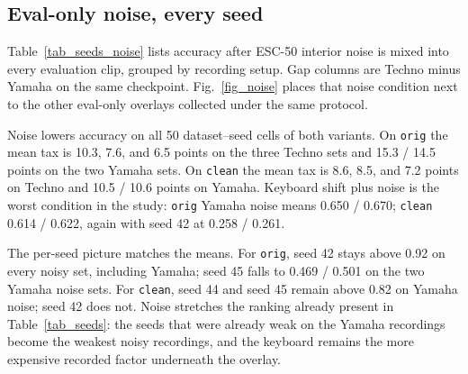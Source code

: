 \documentclass[pdflatex,sn-mathphys-num,iicol]{sn-jnl}
\begin{document}
\subsection{Eval-only noise, every seed}\label{subsec_res_noise}

Table~\ref{tab_seeds_noise} lists accuracy after ESC-50 interior noise is mixed into every evaluation clip, grouped by recording setup. Gap columns are Techno minus Yamaha on the same checkpoint. Fig.~\ref{fig_noise} places that noise condition next to the other eval-only overlays collected under the same protocol.

Noise lowers accuracy on all 50 dataset--seed cells of both variants. On \texttt{orig} the mean tax is 10.3, 7.6, and 6.5 points on the three Techno sets and 15.3 / 14.5 points on the two Yamaha sets. On \texttt{clean} the mean tax is 8.6, 8.5, and 7.2 points on Techno and 10.5 / 10.6 points on Yamaha. Keyboard shift plus noise is the worst condition in the study: \texttt{orig} Yamaha noise means 0.650 / 0.670; \texttt{clean} 0.614 / 0.622, again with seed 42 at 0.258 / 0.261.

The per-seed picture matches the means. For \texttt{orig}, seed 42 stays above 0.92 on every noisy set, including Yamaha; seed 45 falls to 0.469 / 0.501 on the two Yamaha noise sets. For \texttt{clean}, seed 44 and seed 45 remain above 0.82 on Yamaha noise; seed 42 does not. Noise stretches the ranking already present in Table~\ref{tab_seeds}: the seeds that were already weak on the Yamaha recordings become the weakest noisy recordings, and the keyboard remains the more expensive recorded factor underneath the overlay.
\end{document}
